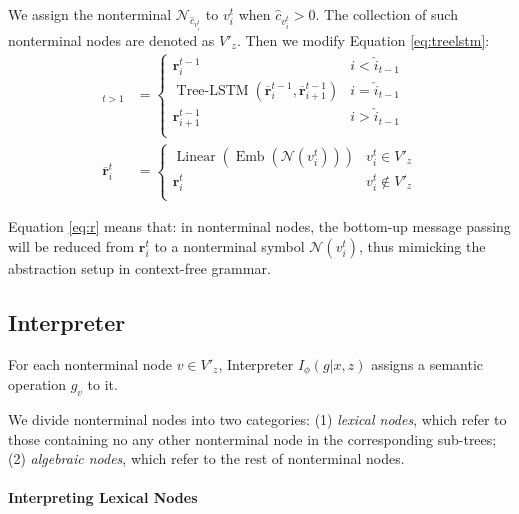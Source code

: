 \documentclass[11pt,a4paper]{article}
\begin{document}
We assign the nonterminal $\mathcal{N}_{\hat{c}_{v_i^t}}$ to $v_i^t$ when $\hat{c}_{v_i^t}>0$.
The collection of such nonterminal nodes are denoted as $V'_{z}$.
Then we modify Equation \ref{eq:treelstm}:
\begin{equation}\label{eq:r}
\begin{split}
\mathop{\mathbf{r}_{i}^{t}}_{t>1} &=
\begin{cases}
\mathbf{r}_{i}^{t-1} & i<\hat{i}_{t-1}\\
\operatorname{Tree-LSTM} (  \overline{\mathbf{r}}_i^{t-1}, \overline{\mathbf{r}}_{i+1}^{t-1} ) & i=\hat{i}_{t-1}\\
\mathbf{r}_{i+1}^{t-1} & i>\hat{i}_{t-1}\\
\end{cases} \\
\overline{\mathbf{r}}_{i}^{t} &=
\begin{cases}
\operatorname{Linear}(\operatorname{Emb}(\mathcal{N}(v_i^t))) & v_i^t\in V'_{z}\\
\mathbf{r}_{i}^{t} & v_i^t\not\in V'_{z}\\
\end{cases}
\end{split}
\end{equation}

Equation \ref{eq:r} means that: in nonterminal nodes, the bottom-up message passing will be reduced from $\mathbf{r}_i^t$ to a nonterminal symbol $\mathcal{N}(v_i^t)$, thus mimicking the abstraction setup in context-free grammar.











\subsection{Interpreter}







For each nonterminal node $v\in V'_{z}$, Interpreter $I_\phi(g|x, z)$ assigns a semantic operation $g_v$ to it.

We divide nonterminal nodes into two categories:
(1) \textit{lexical nodes}, which refer to those containing no any other nonterminal node in the corresponding sub-trees;
(2) \textit{algebraic nodes}, which refer to the rest of nonterminal nodes.

\paragraph{Interpreting Lexical Nodes}
\end{document}
